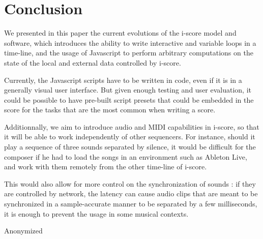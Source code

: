 \documentclass{article}
\begin{document}
\section{Conclusion}
We presented in this paper the current evolutions of the i-score 
model and software, which introduces the ability to write interactive and variable loops in a time-line, 
and the usage of Javascript to perform arbitrary computations on the state of the local and external data controlled by i-score.

Currently, the Javascript scripts have to be written in code, even if it 
is in a generally visual user interface. 
But given enough testing and user evaluation, it could be possible to have pre-built script presets 
that could be embedded in the score for the tasks that are the most common when writing a score.

Additionnally, we aim to introduce audio and MIDI capabilities in i-score, so that 
it will be able to work independently of other sequencers.
For instance, should it play a sequence of three sounds separated by silence, 
it would be difficult for the composer if he had to load 
the songs in an environment such as Ableton Live, and work with them remotely from the other time-line of i-score.

This would also allow for more control on the synchronization of sounds : if they are controlled by network, 
the latency can cause audio clips that are meant to be synchronized in a sample-accurate manner to be separated by a few milliseconds, it is enough to prevent the usage in some musical contexts.

\begin{acknowledgments}
    Anonymized %
\end{acknowledgments} 


\end{document}
